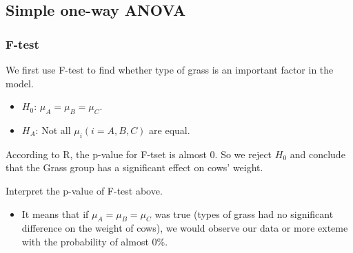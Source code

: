 \documentclass[a4paper,11pt,onecolumn,twoside]{article}
\begin{document}
\subsection{Simple one-way ANOVA}
\subsubsection{F-test}
We first use F-test to find whether type of grass is an important factor in the model.\par 
\begin{itemize}
	\item $H_0$: $\mu_A=\mu_B=\mu_C$. 
	\item $H_A$: Not all $\mu_i ( i=A,B,C ) $ are equal.
\end{itemize}
\par
According to R, the p-value for F-tset is almost 0. So we reject $H_0$ and conclude that the Grass group has a significant effect on cows' weight.\par 
Interpret the p-value of F-test above.
\begin{itemize}
	\item It means that if $\mu_A=\mu_B=\mu_C$ was true (types of grass had no significant difference on the weight of cows), we would observe our data or more exteme with the probability of almost 0\%.
\end{itemize}
\end{document}
